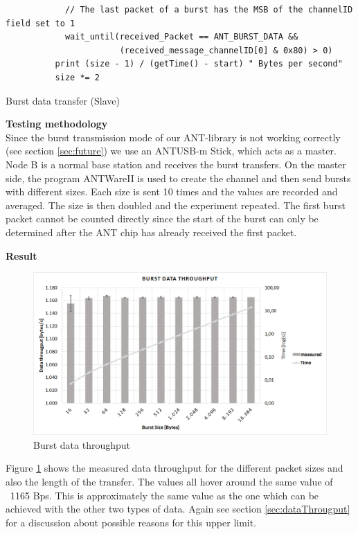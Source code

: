 \begin{description}
\begin{code}[H]
\begin{verbatim}
		    // The last packet of a burst has the MSB of the channelID field set to 1
		    wait_until(received_Packet == ANT_BURST_DATA && 
		               (received_message_channelID[0] & 0x80) > 0)		    
		  print (size - 1) / (getTime() - start) " Bytes per second"
		  size *= 2
		\end{verbatim}
		\caption{Burst data transfer (Slave)}\label{lst:sExp5}
	\end{code}
	\item{\textbf{Testing methodology}} \hfill \\ Since the burst transmission mode of our ANT-library is not working correctly (see section \ref{sec:future}) we use an ANTUSB-m Stick, which acts as a master. Node B is a normal base station and receives the burst transfers. On the master side, the program ANTWareII \cite{ANTwareII} is used to create the channel and then send bursts with different sizes. Each size is sent 10 times and the values are recorded and averaged. The size is then doubled and the experiment repeated. The first burst packet cannot be counted directly since the start of the burst can only be determined after the ANT chip has already received the first packet.
	\newpage
	\item{\textbf{Result}} \hfill \\ 
	\begin{figure}[H]
		\centering
		\includegraphics[scale=0.5]{content/images/exp5.png}
		\caption{Burst data throughput}\label{fig:exp5}
	\end{figure}
	Figure \ref{fig:exp5} shows the measured data throughput for the different packet sizes and also the length of the transfer. The values all hover around the same value of ~1165 Bps. This is approximately the same value as the one which can be achieved with the other two types of data.
	Again see section \ref{sec:dataThrougput} for a discussion about possible reasons for this upper limit. 
\end{description}
\newpage

